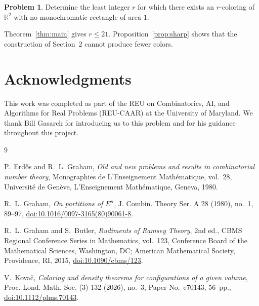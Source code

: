 \documentclass[12pt,reqno]{amsart}
\theoremstyle{remark}
\theoremstyle{definition}
\newtheorem{problem}{Problem}
\numberwithin{equation}{section}
\begin{document}
\begin{problem}\label{prob:min-colors}
Determine the least integer $r$ for which there exists an $r$-coloring of $\mathbb R^2$ with no monochromatic rectangle of area $1$.
\end{problem}

Theorem~\ref{thm:main} gives $r\le21$. Proposition~\ref{prop:sharp} shows that the construction of Section~2 cannot produce fewer colors.

\section*{Acknowledgments}

This work was completed as part of the REU on Combinatorics, AI, and Algorithms for Real Problems (REU-CAAR) at the University of Maryland. We thank Bill Gasarch for introducing us to this problem and for his guidance throughout this project.

{\small

\begin{thebibliography}{9}

P.~Erd\H{o}s and R.~L. Graham,
\emph{Old and new problems and results in combinatorial number theory},
Monographies de L'Enseignement Math\'ematique, vol.~28,
Universit\'e de Gen\`eve, L'Enseignement Math\'ematique,
Geneva, 1980.

R.~L. Graham,
\emph{On partitions of $E^n$},
J. Combin. Theory Ser. A 28 (1980), no.~1, 89--97,
\href{https://doi.org/10.1016/0097-3165(80)90061-8}
{doi:10.1016/0097-3165(80)90061-8}.

R.~L. Graham and S.~Butler,
\emph{Rudiments of Ramsey Theory}, 2nd ed.,
CBMS Regional Conference Series in Mathematics, vol.~123,
Conference Board of the Mathematical Sciences, Washington, DC;
American Mathematical Society, Providence, RI, 2015,
\href{https://doi.org/10.1090/cbms/123}
{doi:10.1090/cbms/123}.

V.~Kova\v{c},
\emph{Coloring and density theorems for configurations of a given volume},
Proc. Lond. Math. Soc. (3) 132 (2026), no.~3,
Paper No.~e70143, 56~pp.,
\href{https://doi.org/10.1112/plms.70143}
{doi:10.1112/plms.70143}.

\end{thebibliography}

}
\end{document}
